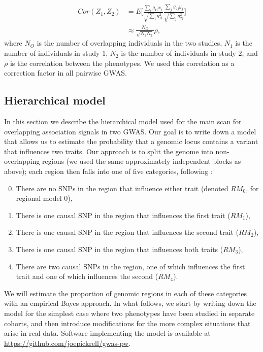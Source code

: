 \documentclass[11pt,titlepage]{article}
\begin{document}
\begin{align}
Cor(Z_1, Z_2) &= E \bigg[  \frac{\sum_ig_{1i} x_i}{ \sqrt{\sum_i g_{1i}^2}}\frac{ \sum_j g_{2j} y_j}{ \sqrt{\sum_j g_{2j}^2}} \bigg] \\
& \approx \frac{N_O}{\sqrt{N_1 N_2}} \rho,
\end{align}
\noindent where $N_O$ is the number of overlapping individuals in the two studies, $N_1$ is the number of individuals in study 1, $N_2$ is the number of individuals in study 2, and $\rho$ is the correlation between the phenotypes. We used this correlation as a correction factor in all pairwise GWAS. 

\subsection{Hierarchical model}  \label{hm}
In this section we describe the hierarchical model used for the main scan for overlapping association signals in two GWAS. Our goal is to write down a model that allows us to estimate the probability that a genomic locus contains a variant that influences two traits. Our approach is to split the genome into non-overlapping regions (we used the same approximately independent blocks as above); each region then falls into one of five categories, following \citet{Giambartolomei:2014aa}:
\begin{enumerate}
\setcounter{enumi}{-1}
\item There are no SNPs in the region that influence either trait (denoted $RM_{0}$, for regional model 0),
\item There is one causal SNP in the region that influences the first trait ($RM_1$),
\item There is one causal SNP in the region that influences the second trait ($RM_2$),
\item There is one causal SNP in the region that influences both traits ($RM_3$),
\item There are two causal SNPs in the region, one of which influences the first trait and one of which influences the second ($RM_4$).
\end{enumerate}

We will estimate the proportion of genomic regions in each of these categories with an empirical Bayes approach. In what follows, we start by writing down the model for the simplest case where two phenotypes have been studied in separate cohorts, and then introduce modifications for the more complex situations that arise in real data. Software implementing the model is available at \url{https://github.com/joepickrell/gwas-pw}. 
\end{document}
